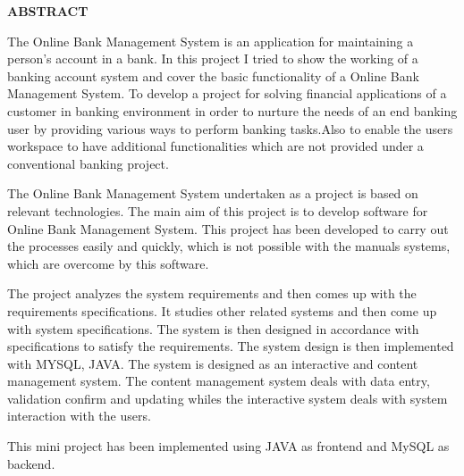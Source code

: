 \pagestyle{empty}
\begin{center}
\textup{\large{\textbf{ABSTRACT}}}
\end{center}

\justify
\indent
The Online Bank Management System is an application for maintaining a person's account in a bank. In this project I tried to show the working of a banking account system and cover the basic functionality of a Online Bank Management System. To develop a project for solving financial applications of a customer in banking environment in order to nurture the needs of an end banking user by providing various ways to perform banking tasks.Also to enable the users workspace to have additional functionalities which are not provided under a conventional banking project.


The Online Bank Management System undertaken as a project is based on
relevant technologies. The main aim of this project is to develop software for Online Bank Management System. This project has been developed to carry out the processes easily and quickly, which is not possible with the manuals systems, which are overcome by this software.


The project analyzes the system requirements and then comes up with the
requirements specifications. It studies other related systems and then come up with system specifications. The system is then designed in accordance with specifications to satisfy the requirements. The system design is then implemented with MYSQL, JAVA. The system is designed as an interactive and content management system. The content management system deals with data entry, validation confirm and updating whiles the interactive system deals with system interaction with the users.


This mini project has been implemented using JAVA as frontend and MySQL as backend.
\pagebreak
